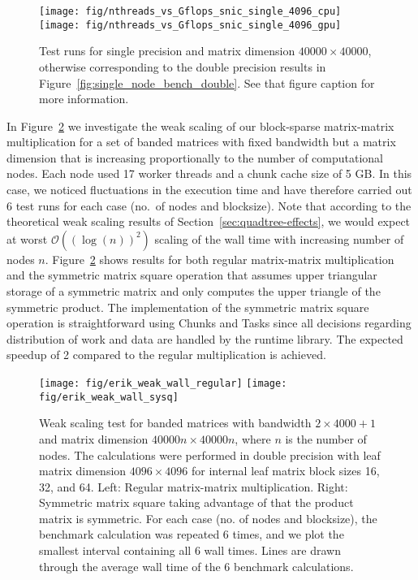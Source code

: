 \documentclass{elsarticle}
\begin{document}
\begin{figure}
  \begin{center}
    \texttt{[image: fig/nthreads\_vs\_Gflops\_snic\_single\_4096\_cpu]}
    \texttt{[image: fig/nthreads\_vs\_Gflops\_snic\_single\_4096\_gpu]}
  \end{center}
  \caption{Test runs for single precision and matrix dimension $40
    000\times 40 000$, otherwise corresponding to the double precision
    results in Figure~\ref{fig:single_node_bench_double}. See that
    figure caption for more
    information. \label{fig:single_node_bench_single}}
\end{figure}

In Figure~\ref{fig:weak_scaling_erik} we investigate the weak scaling
of our block-sparse matrix-matrix multiplication for a set of banded matrices with
fixed bandwidth but a matrix dimension that is increasing proportionally to the
number of computational nodes.
Each node used 17 worker threads and a chunk cache size of 5 GB.
In this case, we noticed fluctuations
in the execution time and have therefore carried out 6 test runs for
each case (no.~of nodes and blocksize). 
Note that according to the theoretical weak scaling results of
Section~\ref{sec:quadtree-effects}, we would expect at worst $\mathcal{O}((\log
(n))^2)$ scaling of the wall time with increasing number of nodes $n$.
Figure~\ref{fig:weak_scaling_erik} shows results for both regular matrix-matrix multiplication and
the symmetric matrix square
operation that assumes upper triangular storage of a symmetric matrix
and only computes the upper triangle of the symmetric product. The
implementation of
the symmetric matrix square
operation is straightforward using Chunks and
Tasks since all decisions regarding distribution of work and data are
handled by the runtime library.  The expected speedup of 2
compared to the regular multiplication is achieved.


\begin{figure}
  \begin{center}
    \texttt{[image: fig/erik\_weak\_wall\_regular]}
    \texttt{[image: fig/erik\_weak\_wall\_sysq]}
  \end{center}
  \caption{Weak scaling test for banded matrices with bandwidth $2
    \times 4000+1$ and matrix dimension $40000n \times 40000n$, where
    $n$ is the number of nodes.  The calculations were performed in
    double precision with leaf matrix dimension $4096 \times 4096$ for
    internal leaf matrix block sizes 16, 32, and 64.  Left: Regular
    matrix-matrix multiplication. Right: Symmetric matrix square
    taking advantage of that the product matrix is symmetric.  For
    each case (no. of nodes and blocksize), the benchmark calculation
    was repeated 6 times, and we plot the smallest interval containing
    all 6 wall times.  Lines are drawn through the average
    wall time of the 6 benchmark calculations.  \label{fig:weak_scaling_erik}}
\end{figure}
\end{document}
